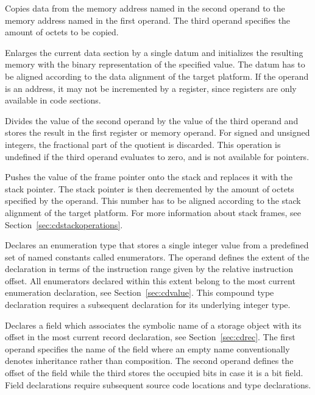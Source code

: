 Copies data from the memory address named in the second operand to the memory address named in the first operand.
The third operand specifies the amount of octets to be copied.


Enlarges the current data section by a single datum and initializes the resulting memory with the binary representation of the specified value.
The datum has to be aligned according to the data alignment of the target platform.
If the operand is an address, it may not be incremented by a register, since registers are only available in code sections.


Divides the value of the second operand by the value of the third operand and stores the result in the first register or memory operand.
For signed and unsigned integers, the fractional part of the quotient is discarded.
This operation is undefined if the third operand evaluates to zero, and is not available for pointers.


Pushes the value of the frame pointer onto the stack and replaces it with the stack pointer.
The stack pointer is then decremented by the amount of octets specified by the operand.
This number has to be aligned according to the stack alignment of the target platform.
For more information about stack frames, see Section~\ref{sec:cdstackoperations}.


Declares an enumeration type that stores a single integer value from a predefined set of named constants called enumerators.
The operand defines the extent of the declaration in terms of the instruction range given by the relative instruction offset.
All enumerators declared within this extent belong to the most current enumeration declaration, see Section~\ref{sec:cdvalue}.
This compound type declaration requires a subsequent declaration for its underlying integer type.


Declares a field which associates the symbolic name of a storage object with its offset in the most current record declaration, see Section~\ref{sec:cdrec}.
The first operand specifies the name of the field where an empty name conventionally denotes inheritance rather than composition.
The second operand defines the offset of the field while the third stores the occupied bits in case it is a bit field.
Field declarations require subsequent source code locations and type declarations.

